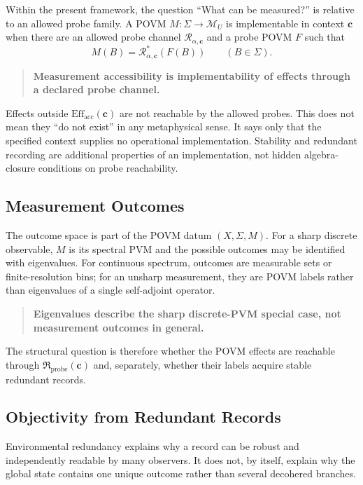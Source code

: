 \documentclass[12pt,a4paper,openany]{book}
\begin{document}
Within the present framework, the question ``What can be measured?'' is relative to an allowed probe family.  A POVM $M:\Sigma\to\mathcal M_U$ is implementable in context $\mathbf c$ when there are an allowed probe channel $\mathcal R_{\alpha,\mathbf c}$ and a probe POVM $F$ such that
\[
M(B)=\mathcal R_{\alpha,\mathbf c}^{*}(F(B))
\qquad(B\in\Sigma).
\]

\begin{quote}
\textbf{Measurement accessibility is implementability of effects through a declared probe channel.}
\end{quote}

Effects outside $\mathrm{Eff}_{\mathrm{acc}}(\mathbf c)$ are not reachable by the allowed probes.  This does not mean they ``do not exist'' in any metaphysical sense.  It says only that the specified context supplies no operational implementation.  Stability and redundant recording are additional properties of an implementation, not hidden algebra-closure conditions on probe reachability.

\subsection{Measurement Outcomes}

The outcome space is part of the POVM datum $(X,\Sigma,M)$.  For a sharp discrete observable, $M$ is its spectral PVM and the possible outcomes may be identified with eigenvalues.  For continuous spectrum, outcomes are measurable sets or finite-resolution bins; for an unsharp measurement, they are POVM labels rather than eigenvalues of a single self-adjoint operator.

\begin{quote}
\textbf{Eigenvalues describe the sharp discrete-PVM special case, not measurement outcomes in general.}
\end{quote}

The structural question is therefore whether the POVM effects are reachable through $\mathfrak R_{\mathrm{probe}}(\mathbf c)$ and, separately, whether their labels acquire stable redundant records.

\subsection{Objectivity from Redundant Records}

Environmental redundancy explains why a record can be robust and independently readable by many observers.  It does not, by itself, explain why the global state contains one unique outcome rather than several decohered branches.
\end{document}
